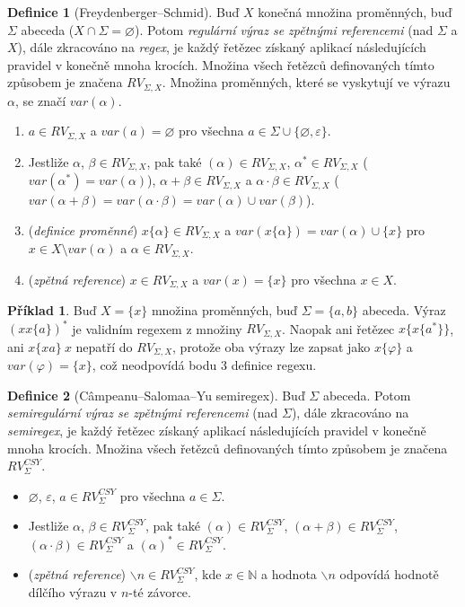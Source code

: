 \documentclass[thesis=B,czech]{FITthesis}[2019/12/23]
\theoremstyle{definition}
\newtheorem{definition}{Definice}[chapter]
\newtheorem{example}{Příklad}[chapter]
\begin{document}
\begin{definition}[Freydenberger--Schmid]
Buď $X$ konečná množina proměnných, buď $\Sigma$ abeceda ($X\cap\Sigma = \varnothing$). Potom \emph{regulární výraz se zpětnými referencemi} (nad $\Sigma$ a $X$), dále zkracováno na \emph{regex}, je každý řetězec získaný aplikací následujících pravidel v konečně mnoha krocích. 
Množina všech řetězců definovaných tímto způsobem je značena $RV_{\Sigma, X}$. Množina proměnných, které se vyskytují ve výrazu $\alpha$, se značí $var(\alpha)$.
\begin{enumerate}
	\item{$a \in RV_{\Sigma, X}$ a $var(a) = \varnothing$ pro všechna $a \in \Sigma\cup\{\varnothing, \varepsilon\}$.}
	\item{Jestliže $\alpha$, $\beta \in RV_{\Sigma, X}$, pak také  $(\alpha) \in RV_{\Sigma, X}$, $\alpha^\ast \in RV_{\Sigma, X}$ ($var(\alpha^\ast)=var(\alpha)$),  $\alpha + \beta \in RV_{\Sigma, X}$ a $\alpha \cdot \beta \in RV_{\Sigma, X}$ ($var(\alpha + \beta)=var(\alpha \cdot \beta)=var(\alpha)\cup var(\beta)$).}
	\item(\emph{definice proměnné}){ $x \{ \alpha \} \in RV_{\Sigma, X}$ a $var(x \{\alpha\}) = var(\alpha)\cup\{x\}$ pro $x \in X \setminus var(\alpha)$ a $\alpha \in RV_{\Sigma, X}$.}
	\item(\emph{zpětná reference}){ $x \in RV_{\Sigma, X}$ a $var(x) = \{x\}$ pro všechna $x \in X$. \cite{schmidref}}
\end{enumerate}
\end{definition}

\begin{example} 
Buď $X=\{x\}$ množina proměnných, buď $\Sigma=\{a, b\}$ abeceda. Výraz $(x x\{a\})^\ast$ je validním regexem z množiny $RV_{\Sigma, X}$. Naopak ani řetězec $x\{x\{a^\ast\}\}$, ani $x\{xa\} \ x$ nepatří do $RV_{\Sigma, X}$, protože oba výrazy lze zapsat jako $x\{\varphi\}$ a $var(\varphi) = \{x\}$, což neodpovídá bodu 3 definice regexu.
\end{example}

\begin{definition}[Câmpeanu--Salomaa--Yu semiregex]
Buď $\Sigma$ abeceda. Potom \emph{semiregulární výraz se zpětnými referencemi} (nad $\Sigma$), dále zkracováno na \emph{semiregex}, je každý řetězec získaný aplikací následujících pravidel v konečně mnoha krocích. Množina všech řetězců definovaných tímto způsobem je značena $RV_{\Sigma}^{CSY}$.
\begin{itemize}
	\item{$\varnothing$, $\varepsilon$, $a \in RV_{\Sigma}^{CSY}$ pro všechna $a \in \Sigma$.}
	\item{Jestliže $\alpha$, $\beta \in RV_{\Sigma}^{CSY}$, pak také $(\alpha) \in RV_{\Sigma}^{CSY}$, $\left(\alpha + \beta \right) \in RV_{\Sigma}^{CSY}$, $\left(\alpha \cdot \beta \right)\in RV_{\Sigma}^{CSY}$ a $(\alpha)^\ast \in RV_{\Sigma}^{CSY}$.}
	\item(\emph{zpětná reference}){ $\backslash n \in RV_{\Sigma}^{CSY}$, kde $x \in \mathbb{N} $ a hodnota $\backslash n$ odpovídá hodnotě dílčího výrazu v $n$-té závorce. \cite{campeanu}} 
\end{itemize}
\end{definition}
\end{document}
